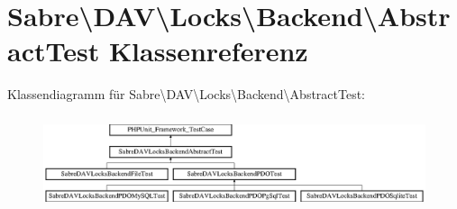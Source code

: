 \hypertarget{class_sabre_1_1_d_a_v_1_1_locks_1_1_backend_1_1_abstract_test}{}\section{Sabre\textbackslash{}D\+AV\textbackslash{}Locks\textbackslash{}Backend\textbackslash{}Abstract\+Test Klassenreferenz}
\label{class_sabre_1_1_d_a_v_1_1_locks_1_1_backend_1_1_abstract_test}
Klassendiagramm für Sabre\textbackslash{}D\+AV\textbackslash{}Locks\textbackslash{}Backend\textbackslash{}Abstract\+Test\+:\begin{figure}[H]
\begin{center}
\leavevmode
\includegraphics[height=2.745098cm]{class_sabre_1_1_d_a_v_1_1_locks_1_1_backend_1_1_abstract_test}
\end{center}
\end{figure}
